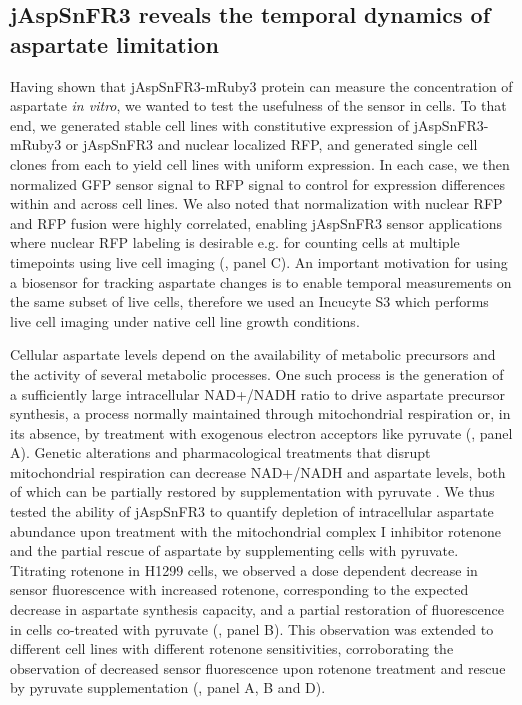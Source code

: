 \documentclass[9pt,lineno]{elife}
\begin{document}
\subsection{jAspSnFR3 reveals the temporal dynamics of aspartate limitation}
Having shown that jAspSnFR3-mRuby3 protein can measure the concentration of aspartate \textit{in vitro}, we wanted to test the usefulness of the sensor in cells.
To that end, we generated stable cell lines with constitutive expression of jAspSnFR3-mRuby3 or jAspSnFR3 and nuclear localized RFP, and generated single cell clones from each to yield cell lines with uniform expression.
In each case, we then normalized GFP sensor signal to RFP signal to control for expression differences within and across cell lines.
We also noted that normalization with nuclear RFP and RFP fusion were highly correlated, enabling jAspSnFR3 sensor applications where nuclear RFP labeling is desirable e.g. for counting cells at multiple timepoints using live cell imaging (, panel C).
An important motivation for using a biosensor for tracking aspartate changes is to enable temporal measurements on the same subset of live cells, therefore we used an Incucyte S3 which performs live cell imaging under native cell line growth conditions.

Cellular aspartate levels depend on the availability of metabolic precursors and the activity of several metabolic processes.
One such process is the generation of a sufficiently large intracellular NAD+/NADH ratio to drive aspartate precursor synthesis, a process normally maintained through mitochondrial respiration or, in its absence, by treatment with exogenous electron acceptors like pyruvate (, panel A).
Genetic alterations and pharmacological treatments that disrupt mitochondrial respiration can decrease NAD+/NADH and aspartate levels, both of which can be partially restored by supplementation with pyruvate \citep{Sullivan2015-xf, Birsoy2015-pg}.
We thus tested the ability of jAspSnFR3 to quantify depletion of intracellular aspartate abundance upon treatment with the mitochondrial complex I inhibitor rotenone and the partial rescue of aspartate by supplementing cells with pyruvate.
Titrating rotenone in H1299 cells, we observed a dose dependent decrease in sensor fluorescence with increased rotenone, corresponding to the expected decrease in aspartate synthesis capacity, and a partial restoration of fluorescence in cells co-treated with pyruvate (, panel B).
This observation was extended to different cell lines with different rotenone sensitivities, corroborating the observation of decreased sensor fluorescence upon rotenone treatment and rescue by pyruvate supplementation (, panel A, B and D).
\end{document}
